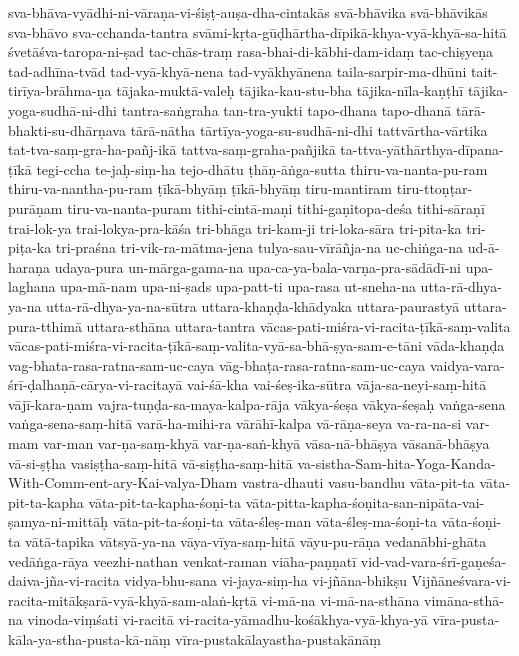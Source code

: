 {sva-bhāva-vyādhi-ni-vāraṇa-vi-śiṣṭ-auṣa-dha-cintakās
svā-bhāvika
svā-bhāvikās
    sva-bhāvo
sva-cchanda-tantra
    svāmi-kṛta-gūḍhārtha-dīpikā-khya-vyā-khyā-sa-hitā
śvetāśva-taropa-ni-ṣad
    tac-chās-traṃ rasa-bhai-di-kābhi-dam-idaṃ
tac-chiṣyeṇa
    tad-adhīna-tvād
     tad-vyā-khyā-nena 
  tad-vyākhyānena 
taila-sarpir-ma-dhūni
tait-tirīya-brāhma-ṇa
tājaka-muktā-valeḥ
tājika-kau-stu-bha
tājika-nīla-kaṇṭhī
tājika-yoga-sudhā-ni-dhi
tantra-saṅgraha
tan-tra-yukti
tapo-dhana
tapo-dhanā
tārā-bhakti-su-dhārṇava
tārā-nātha
tārtīya-yoga-su-sudhā-ni-dhi
tattvārtha-vārtika
    tat-tva-saṃ-gra-ha-pañj-ikā
    tattva-saṃ-graha-pañjikā
    ta-ttva-yāthārthya-dīpana-ṭīkā  
tegi-ccha
te-jaḥ-siṃ-ha
tejo-dhātu
ṭhāṇ-āṅga-sutta
    thiru-va-nanta-pu-ram    thiru-va-nantha-pu-ram
     ṭīkā-bhyāṃ 
ṭīkā-bhyāṃ
tiru-mantiram
tiru-ttoṇṭar-purāṇam
tiru-va-nanta-puram
tithi-cintā-maṇi
tithi-gaṇitopa-deśa
tithi-sāraṇī
trai-lok-ya
trai-lokya-pra-kāśa
tri-bhāga
tri-kam-ji
tri-loka-sāra
tri-pita-ka
tri-piṭa-ka
tri-praśna
tri-vik-ra-mātma-jena
tulya-sau-vīrāñja-na
uc-chiṅga-na
ud-ā-haraṇa
udaya-pura
un-mārga-gama-na
upa-ca-ya-bala-varṇa-pra-sādādī-ni
upa-laghana
    upa-mā-nam
upa-ni-ṣads
upa-patt-ti
upa-rasa
ut-sneha-na
utta-rā-dhya-ya-na
utta-rā-dhya-ya-na-sūtra
uttara-khaṇḍa-khādyaka
uttara-paurastyā
uttara-pura-tthimā
uttara-sthāna
uttara-tantra
vācas-pati-miśra-vi-racita-ṭīkā-saṃ-valita
vācas-pati-miśra-vi-racita-ṭīkā-saṃ-valita-vyā-sa-bhā-ṣya-sam-e-tāni
vāda-khaṇḍa
vag-bhata-rasa-ratna-sam-uc-caya
vāg-bhaṭa-rasa-ratna-sam-uc-caya
vaidya-vara-śrī-ḍalhaṇā-cārya-vi-racitayā
vai-śā-kha
vai-śeṣ-ika-sūtra
vāja-sa-neyi-saṃ-hitā
vājī-kara-ṇam
    vajra-tuṇḍa-sa-maya-kalpa-rāja
vākya-śeṣa
vākya-śeṣaḥ
vaṅga-sena
vaṅga-sena-saṃ-hitā
varā-ha-mihi-ra
vārāhī-kalpa
vā-rāṇa-seya
va-ra-na-si
var-mam
var-man
var-ṇa-saṃ-khyā
var-ṇa-saṅ-khyā
vāsa-nā-bhāṣya
vāsanā-bhāṣya
vā-si-ṣṭha
vasiṣṭha-saṃ-hitā
vā-siṣṭha-saṃ-hitā
va-sistha-Sam-hita-Yoga-Kanda-With-Comm-ent-ary-Kai-valya-Dham
vastra-dhauti
vasu-bandhu
vāta-pit-ta
vāta-pit-ta-kapha
vāta-pit-ta-kapha-śoṇi-ta
vāta-pitta-kapha-śoṇita-san-nipāta-vai-ṣamya-ni-mittāḥ
vāta-pit-ta-śoṇi-ta
vāta-śleṣ-man
vāta-śleṣ-ma-śoṇi-ta
vāta-śoṇi-ta
vātā-tapika
vātsyā-ya-na
vāya-vīya-saṃ-hitā
    vāyu-pu-rāṇa 
vedanābhi-ghāta
vedāṅga-rāya
veezhi-nathan
venkat-raman
viāha-paṇṇatī
vid-vad-vara-śrī-gaṇeśa-daiva-jña-vi-racita
vidya-bhu-sana
vi-jaya-siṃ-ha
vi-jñāna-bhikṣu
Vijñāneśvara-vi-racita-mitākṣarā-vyā-khyā-sam-alaṅ-kṛtā
vi-mā-na
vi-mā-na-sthāna
vimāna-sthā-na
vinoda-viṃśati
vi-racitā
vi-racita-yāmadhu-kośākhya-vyā-khya-yā
    vīra-pusta-kāla-ya-stha-pusta-kā-nāṃ
vīra-pustakālayastha-pustakānāṃ
}
